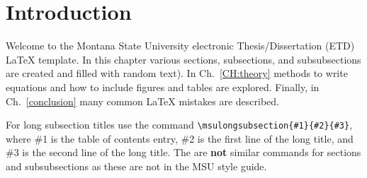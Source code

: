 \chapter{Introduction}\label{CH:introduction}


\label{Sect:test}
Welcome to the Montana State University electronic Thesis/Dissertation (ETD) \LaTeX{} template.  In this chapter various sections, subsections, and subsubsections are created and filled with random text).  In Ch.~\ref{CH:theory} methods to write equations and how to include figures and tables are explored.  Finally, in Ch.~\ref{conclusion} many common \LaTeX{} mistakes are described.

\label{Sect:testsub}
\lipsum[2] %

\label{Sect:testsubsub}
\lipsum[3] %

\label{Sect:longsub}
For long subsection titles use the command \verb|\msulongsubsection{#1}{#2}{#3}|, where \#1 is the table of contents entry, \#2 is the first line of the long title, and \#3 is the second line of the long title.  The are \textbf{not} similar commands for sections and subsubsections as these are not in the MSU style guide.



